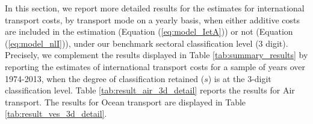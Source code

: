 \documentclass[a4paper,11pt]{article}
\begin{document}
In this section, we report more detailed results for the estimates for international transport costs, by transport mode on a yearly basis, when either additive costs are included in the estimation (Equation (\ref{eq:model_IetA})) or not (Equation (\ref{eq:model_nlI})), under our benchmark sectoral classification level (3 digit). Precisely, we complement the results displayed in Table \ref{tab:summary_results} by reporting the estimates of international transport costs for a sample of years over 1974-2013, when the degree of classification retained ($s$) is at the 3-digit classification level. Table \ref{tab:result_air_3d_detail} reports the results for Air transport. The results for Ocean transport are displayed in Table \ref{tab:result_ves_3d_detail}.

\end{document}
